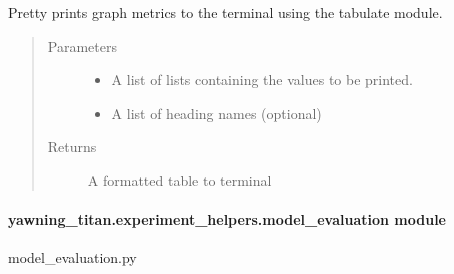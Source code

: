 \documentclass[letterpaper,10pt,english]{sphinxmanual}
\begin{document}

\begin{fulllineitems}
\label{\detokenize{source/yawning_titan.experiment_helpers:yawning_titan.experiment_helpers.graph_metrics.pprint_metric_table}}
\sphinxAtStartPar
Pretty prints graph metrics to the terminal using the tabulate
module.
\begin{quote}\begin{description}
\item[{Parameters}] \leavevmode\begin{itemize}
\item {}
\sphinxAtStartPar
{} \textendash{} A list of lists containing the values to be printed.

\item {}
\sphinxAtStartPar
{} \textendash{} A list of heading names (optional)

\end{itemize}

\item[{Returns}] \leavevmode
\sphinxAtStartPar
A formatted table to terminal

\end{description}\end{quote}

\end{fulllineitems}



\paragraph{yawning\_titan.experiment\_helpers.model\_evaluation module}
\label{\detokenize{source/yawning_titan.experiment_helpers:module-yawning_titan.experiment_helpers.model_evaluation}}\label{\detokenize{source/yawning_titan.experiment_helpers:yawning-titan-experiment-helpers-model-evaluation-module}}
\sphinxAtStartPar
model\_evaluation.py
\end{document}
